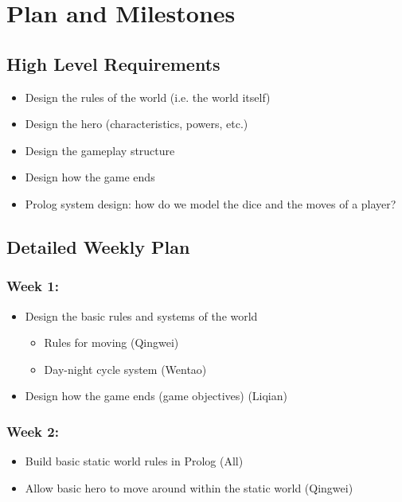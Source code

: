 \documentclass[10pt]{article}
\begin{document}
\section{Plan and Milestones}

\subsection{High Level Requirements}

\begin{itemize}
\item Design the rules of the world (i.e. the world itself)
\item Design the hero (characteristics, powers, etc.)
\item Design the gameplay structure
\item Design how the game ends
\item Prolog system design: how do we model the dice and the moves of a player?
\end{itemize}

\subsection{Detailed Weekly Plan}

\subsubsection*{Week 1:}

\begin{itemize}
\item Design the basic rules and systems of the world
    \begin{itemize}
    \item Rules for moving (Qingwei)
    \item Day-night cycle system (Wentao)
    \end{itemize}
\item Design how the game ends (game objectives) (Liqian)
\end{itemize}


\subsubsection*{Week 2:}

\begin{itemize}
\item Build basic static world rules in Prolog (All)
\item Allow basic hero to move around within the static world (Qingwei)
\end{itemize}
\end{document}
